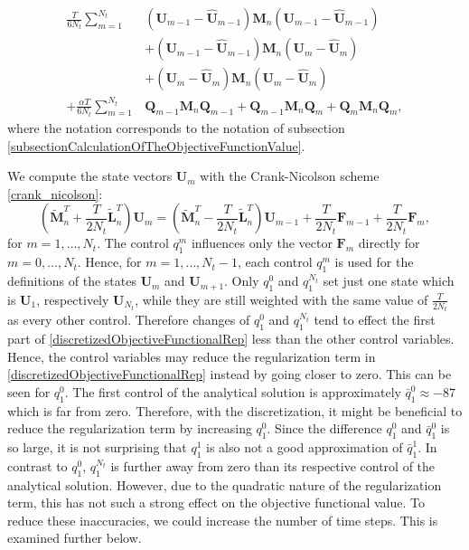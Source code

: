 \begin{equation}
\label{discretizedObjectiveFunctionalRep}
\begin{aligned}
\frac{T}{6N_t}\sum_{m=1}^{N_t}&\left(\mathbf{U}_{m-1}-\hat{\mathbf{U}}_{m-1}\right)\mathbf{M}_n\left(\mathbf{U}_{m-1}-\hat{\mathbf{U}}_{m-1}\right)\\
&+ \left(\mathbf{U}_{m-1}-\hat{\mathbf{U}}_{m-1}\right)\mathbf{M}_n\left(\mathbf{U}_{m}-\hat{\mathbf{U}}_{m}\right)\\
&+ \left(\mathbf{U}_{m}-\hat{\mathbf{U}}_{m}\right)\mathbf{M}_n\left(\mathbf{U}_{m}-\hat{\mathbf{U}}_{m}\right)\\
+ \frac{\alpha T}{6N_t}\sum_{m=1}^{N_t}&\mathbf{Q}_{m-1}\mathbf{M}_n\mathbf{Q}_{m-1} + \mathbf{Q}_{m-1}\mathbf{M}_n\mathbf{Q}_{m} + \mathbf{Q}_{m}\mathbf{M}_n\mathbf{Q}_{m},
\end{aligned}
\end{equation}
where the notation corresponds to the notation of subsection \ref{subsectionCalculationOfTheObjectiveFunctionValue}.

We compute the state vectors $\mathbf{U}_m$ with the Crank-Nicolson scheme \eqref{crank_nicolson}:
\begin{equation*}
\left(\tilde{\mathbf{M}}_n^T + \frac{T}{2N_t} \tilde{\mathbf{L}}_n^T\right) \mathbf{U}_m = \left(\tilde{\mathbf{M}}_n^T - \frac{T}{2N_t} \tilde{\mathbf{L}}_n^T\right) \mathbf{U}_{m-1} + \frac{T}{2N_t} \mathbf{F}_{m-1} + \frac{T}{2N_t} \mathbf{F}_m,
\end{equation*}
for $m=1,\dotsc,N_t$. The control $q^m_1$ influences only the vector $\mathbf{F}_m$ directly for $m=0,\dotsc,N_t$. Hence, for $m=1,\dotsc,N_t-1$, each control $q^m_1$ is used for the definitions of the states $\mathbf{U}_m$ and $\mathbf{U}_{m+1}$. Only $q^0_1$ and $q^{N_t}_1$ set just one state which is $\mathbf{U}_1$, respectively $\mathbf{U}_{N_t}$, while they are still weighted with the same value of $\frac{T}{2N_t}$ as every other control. Therefore changes of $q^0_1$ and $q^{N_t}_1$ tend to effect the first part of \eqref{discretizedObjectiveFunctionalRep} less than the other control variables. Hence, the control variables may reduce the regularization term in \eqref{discretizedObjectiveFunctionalRep} instead by going closer to zero. This can be seen for $q^0_1$. The first control of the analytical solution is approximately $\bar{q}^0_1\approx-87$ which is far from zero. Therefore, with the discretization, it might be beneficial to reduce the regularization term by increasing $q^0_1$. Since the difference $q^0_1$ and $\bar{q}^0_1$ is so large, it is not surprising that $q^1_1$ is also not a good approximation of $\bar{q}^1_1$. In contrast to $q^0_1$, $q^{N_t}_1$ is further away from zero than its respective control of the analytical solution. However, due to the quadratic nature of the regularization term, this has not such a strong effect on the objective functional value. To reduce these inaccuracies, we could increase the number of time steps. This is examined further below.\\

